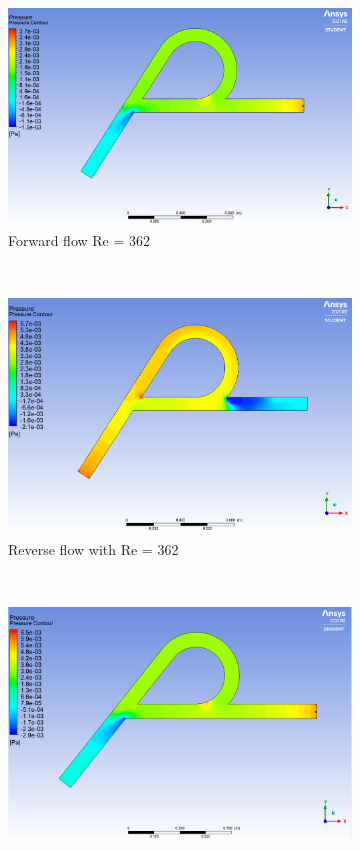 \begin{figure}[H]
\begin{subfigure}{.45\textwidth}
  \includegraphics[width=.9\linewidth]{images/task2/L400/forward362.png}
  \caption{Forward flow Re = 362}
  \label{fig:x_d_norm}
\end{subfigure}%
~
\begin{subfigure}{.45\textwidth}
  \centering
  \includegraphics[width=.9\linewidth]{images/task2/L400/reverse362.png}
  \caption{Reverse flow with Re = 362}
  \label{fig:x_d_norm_actual}
\end{subfigure}
~
\begin{subfigure}{.45\textwidth}
  \centering
  \includegraphics[width=.9\linewidth]{images/task2/L400/forward543.png}

\end{subfigure}
\end{figure}
